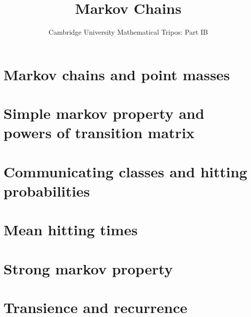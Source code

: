 \documentclass{article}
\title{Markov Chains}
\author{Cambridge University Mathematical Tripos: Part IB}
\begin{document}
\maketitle

\tableofcontentsnewpage{}

\section{Markov chains and point masses}

\section{Simple markov property and powers of transition matrix}

\section{Communicating classes and hitting probabilities}

\section{Mean hitting times}

\section{Strong markov property}

\section{Transience and recurrence}

\end{document}
